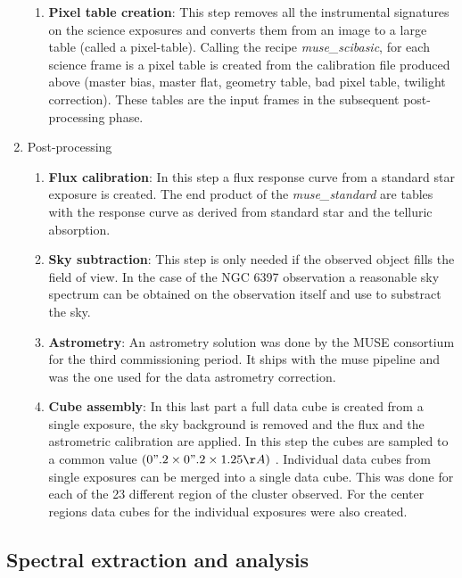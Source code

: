 \begin{enumerate}
\begin{enumerate}[I]
    \item{\textbf{Pixel table creation}}: This step removes all the instrumental signatures on the science exposures and converts them from an image to a large table (called a pixel-table). Calling the recipe \emph{muse\_scibasic}, for each science frame is a pixel table is created from the calibration file produced above (master bias, master flat, geometry table, bad pixel table, twilight correction). These tables are the input frames in the subsequent post-processing phase.
    \end{enumerate}
\item Post-processing
                \begin{enumerate}[I]
			\item \textbf{Flux calibration}:  In this step a flux response curve from a standard star exposure is created. The end product of the \emph{muse\_standard} are tables with the response curve as derived from standard star and the telluric absorption.
                        \item \textbf{Sky subtraction}: This step is only needed if the observed object fills the field of view. In the case of the NGC 6397 observation a reasonable sky spectrum can be obtained on the observation itself and use to substract the sky.   
                        \item \textbf{Astrometry}: An astrometry solution was done by the MUSE consortium for the third commissioning period. It ships with the muse pipeline and was the one used for the data astrometry correction.  
          
			\item \textbf{Cube assembly}: In this last part a full data cube is created from a single exposure, the sky background is removed and the flux and the astrometric calibration are applied. In this step the cubes are sampled to a common value $(0".2 \times 0".2 \times 1.25 Å)$ . Individual data cubes from single exposures can be merged into a single data cube. This was done for each of the 23 different region of the cluster observed. For the center regions data cubes for the individual exposures were also created.  
                \end{enumerate}
\end{enumerate}


\subsection{Spectral extraction and analysis}

